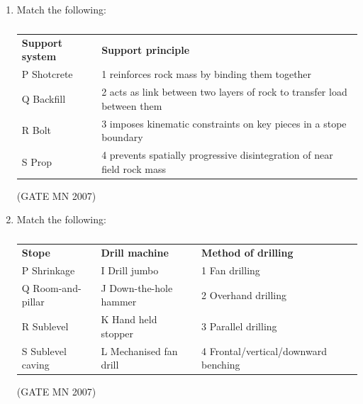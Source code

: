 \documentclass[journal]{IEEEtran}
\begin{document}
\begin{enumerate}
\item Match the following:
\begin{table}[H]
    \centering\normalsize
\begin{tabular}{p{5cm} p{5cm}}
\textbf{Support system} & \textbf{Support principle} \\
P \quad Shotcrete & 1 \quad reinforces rock mass by binding them together \\
Q \quad Backfill & 2 \quad acts as link between two layers of rock to transfer load between them \\
R \quad Bolt & 3 \quad imposes kinematic constraints on key pieces in a stope boundary \\
S \quad Prop & 4 \quad prevents spatially progressive disintegration of near field rock mass \\
\end{tabular}
 \caption{}
    \label{tab:Q39}
\end{table}
\hfill (GATE MN 2007)
\begin{enumerate}
\end{enumerate}


\item Match the following:
\begin{table}[H]
    \centering\normalsize
\begin{tabular}{p{3cm} p{4cm} p{6cm}}
\textbf{Stope} & \textbf{Drill machine} & \textbf{Method of drilling} \\
P \quad Shrinkage & I \quad Drill jumbo & 1 \quad Fan drilling \\
Q \quad Room-and-pillar & J \quad Down-the-hole hammer & 2 \quad Overhand drilling \\
R \quad Sublevel & K \quad Hand held stopper & 3 \quad Parallel drilling \\
S \quad Sublevel caving & L \quad Mechanised fan drill & 4 \quad Frontal/vertical/downward benching \\
\end{tabular}
 \caption{}
    \label{tab:Q40}
\end{table}
\hfill (GATE MN 2007)
\begin{enumerate}
\end{enumerate}




\end{enumerate}
\end{document}
